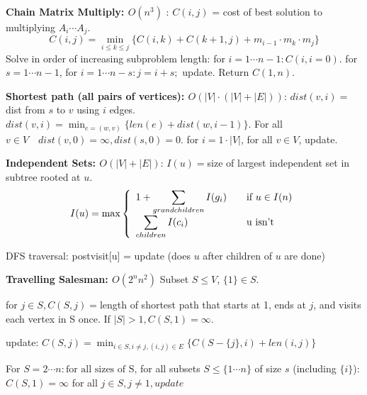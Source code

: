 \documentclass[10pt,twocolumn]{article}
\begin{document}
{\bf Chain Matrix Multiply: $O(n^3)$} : $C(i,j)$ = cost of best solution to multiplying $A_i\cdots A_j$. \[C(i,j)=\displaystyle\min_{i\leq k\leq j}\{ C(i,k)+C(k+1,j) + m_{i-1}\cdot m_k \cdot m_j\}\] Solve in order of increasing subproblem length: for $i=1\cdots n-1: C(i,i=0)$. for $s=1\cdots n-1$, for $i=1\cdots n-s: j=i+s; $ update. Return $C(1,n)$.

{\bf Shortest path (all pairs of vertices): $O(|V|\cdot(|V|+|E|))$}: $dist(v,i)=$ dist from $s$ to $v$ using $i$ edges. $dist(v,i)=\displaystyle\min_{e=(w,v)}\{len(e)+dist(w,i-1)\}$. For all $v\in V \quad dist(v,0)=\infty, dist(s,0)=0$. for $i=1\cdot |V|$, for all $v\in V$, update.

{\bf Independent Sets: $O(|V|+|E|)$}: $I(u)=$size of largest independent set in subtree rooted at $u$. \[I(u) = \max\left\{ \begin{array}{l l} 1+\displaystyle\sum_{grandchildren} I(g_i) & \quad \mbox{if $u\in I(n)$} \\ \displaystyle\sum_{children} I(c_i) & \quad \mbox{u isn't} \\ \end{array} \right. \]

DFS traversal: postvisit[u] = update (does $u$ after children of $u$ are done)

{\bf Travelling Salesman: $O(2^nn^2)$} 
Subset $S \leq V$, $\{1\} \in S$.

for $j\in S, C(S,j)=$length of shortest path that starts at 1, ends at $j$, and visits each vertex in S once. If $|S| > 1, C(S,1)=\infty$.

update: $C(S,j)=\displaystyle\min_{i\in S, i\neq j, (i,j)\in E}\{C(S-\{j\},i)+len(i,j)\}$

For $S=2\cdots n: \mbox{for all sizes of S,}$ for all subsets $S\leq \{1\cdots n\}$ of size $s$ (including $\{i\}$): $C(S,1)=\infty$ for all $j\in S, j\neq 1, update$
\end{document}
